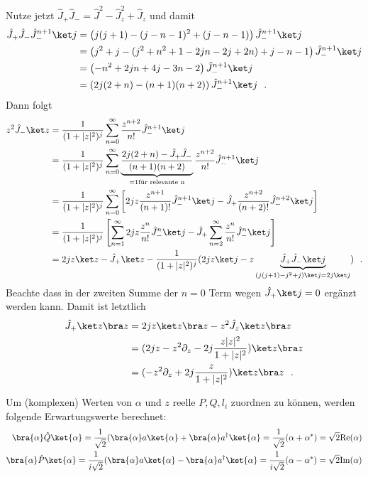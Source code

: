 Nutze jetzt $\hat J_+\hat J_- = \hat J^2 - \hat J_z^2 + \hat J_z$ und damit 
\begin{align*}
  \hat J_+\hat J_- \hat J_-^{n+1} \ket j &= \left( j(j+1) -(j-n-1)^2 + (j-n-1) \right)  \hat J_-^{n+1} \ket j\\
  &= \left( j^2 +j -( j^2 + n^2 + 1 - 2jn -2 j +2n ) + j - n - 1 \right)  \hat J_-^{n+1} \ket j\\
  &= \left( - n^2 +2 j n + 4 j - 3 n -2 \right)  \hat J_-^{n+1} \ket j\\
  &= \left( 2j(2+n) - (n+1)(n+2) \right)  \hat J_-^{n+1} \ket j~~.
\end{align*}
Dann folgt
\begin{align*}
  z^2 \hat J_- \ket z &= \frac{1}{(1+|z|^2)^{j}} \sum\limits_{n=0}^{\infty} \frac{z^{n+2}}{n!}\hat J_-^{n+1}\ket j \\
  &= \frac{1}{(1+|z|^2)^{j}} \sum\limits_{n=0}^{\infty} \underbrace{\frac{2j(2+n)-\hat J_+\hat J_-}{(n+1)(n+2)}}_{ = 1\text{für relevante n}} \frac{z^{n+2}}{n!} \hat J_-^{n+1}\ket j \\
  &= \frac{1}{(1+|z|^2)^{j}} \sum\limits_{n=0}^{\infty} \left[ 2jz \frac {z^{n+1}}{(n+1)!} \hat J_-^{n+1}\ket j - \hat J_+\frac {z^{n+2}}{(n+2)!}\hat J_-^{n+2}\ket j  \right] \\
  &= \frac{1}{(1+|z|^2)^{j}} \left[ \sum\limits_{n=1}^{\infty} 2jz \frac {z^{n}}{n!} \hat J_-^{n}\ket j -\hat J_+\sum\limits_{n=2}^{\infty} \frac {z^{n}}{n!}\hat J_-^{n}\ket j  \right]\\
  &= 2jz \ket z - \hat J_+ \ket z - \frac{1}{(1+|z|^2)^{j}} (2jz \ket j - z \underbrace{ \hat J_+\hat J_- \ket j}_{(j(j+1)-j^2+j)\ket j = 2j \ket j })~~.
\end{align*}
Beachte dass in der zweiten Summe der $n=0$ Term wegen $\hat J_+ \ket j =0$ ergänzt werden kann. 
Damit ist letztlich
\begin{align*}
  \hat J_+\ket z\bra z  &= 2jz \ket z \bra z -z^2 \hat J_z\ket z \bra z \\
  &=  (2jz  - z^2\partial_z - 2j \frac{z |z|^2}{1+|z|^2})\ket z \bra z\\
  &=  (- z^2\partial_z + 2j \frac{z}{1+|z|^2})\ket z \bra z~~.
\end{align*}


Um (komplexen) Werten von $\alpha$ und $z$ reelle $P,Q,l_i$ zuordnen zu können, werden folgende Erwartungswerte berechnet:
\begin{align}
  \bra{\alpha} \hat Q \ket{\alpha} = \frac{1}{\sqrt 2} (\bra{\alpha} a \ket{\alpha} + \bra{\alpha} a^\dagger \ket{\alpha} = \frac{1}{\sqrt 2} (\alpha + \alpha^*) = \sqrt 2\text{Re} (\alpha)\\
  \bra{\alpha} \hat P \ket{\alpha} = \frac{1}{ i \sqrt 2} (\bra{\alpha} a \ket{\alpha} - \bra{\alpha} a^\dagger \ket{\alpha} = \frac{1}{i \sqrt 2} (\alpha - \alpha^*) = \sqrt 2\text{Im} (\alpha)
\end{align}

